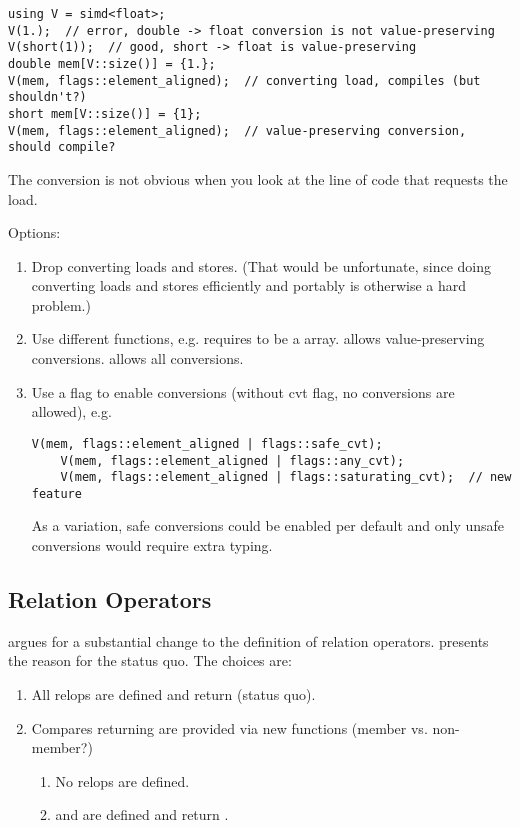 \begin{lstlisting}[style=Vc]
using V = simd<float>;
V(1.);  // error, double -> float conversion is not value-preserving
V(short(1));  // good, short -> float is value-preserving
double mem[V::size()] = {1.};
V(mem, flags::element_aligned);  // converting load, compiles (but shouldn't?)
short mem[V::size()] = {1};
V(mem, flags::element_aligned);  // value-preserving conversion, should compile?
\end{lstlisting}

The conversion is not obvious when you look at the line of code that requests the load.

Options:
\begin{enumerate}
  \item Drop converting loads and stores.
    (That would be unfortunate, since doing converting loads and stores efficiently and portably is otherwise a hard problem.)

  \item Use different functions, e.g.  requires  to be a  array.  allows value-preserving conversions.
     allows all conversions.

  \item Use a flag to enable conversions (without cvt flag, no conversions are allowed), e.g.
    \begin{lstlisting}[style=Vc]
    V(mem, flags::element_aligned | flags::safe_cvt);
    V(mem, flags::element_aligned | flags::any_cvt);
    V(mem, flags::element_aligned | flags::saturating_cvt);  // new feature
    \end{lstlisting}
    As a variation, safe conversions could be enabled per default and only unsafe conversions would require extra typing.

\end{enumerate}

\subsection{Relation Operators}
\textcite{P0820R1} argues for a substantial change to the definition of relation operators.
\textcite{P0851R0} presents the reason for the status quo.
The choices are:
\begin{enumerate}
  \item All relops are defined and return \mask (status quo).
  \item Compares returning \mask are provided via new functions (member vs. non-member?)
    \begin{enumerate}
      \item No relops are defined.
      \item {} and  are defined and return \bool.
    \end{enumerate}
\end{enumerate}



